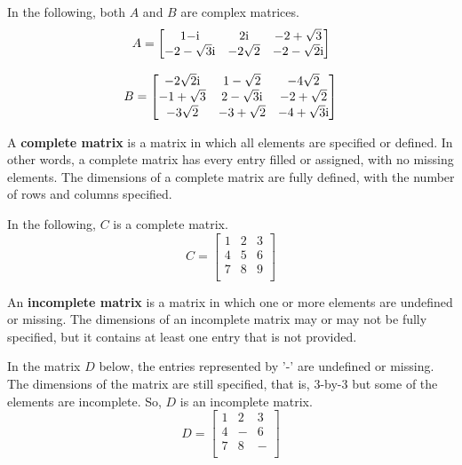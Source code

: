 \begin{definition}
\begin{example}
In the following, both $A$ and $B$ are complex matrices.
\[
A = \begin{bmatrix}
    1 - $i$  & 2$i$ & -2 + \sqrt{3} \\
    -2 - \sqrt{3}$i$ & -2\sqrt{2} & -2 - \sqrt{2}$i$
\end{bmatrix}
\]

\[
B = \begin{bmatrix}
    -2\sqrt{2}$i$ & 1 - \sqrt{2} & -4\sqrt{2} \\
    -1 + \sqrt{3} & 2 - \sqrt{3}$i$ & -2 + \sqrt{2} \\
    -3\sqrt{2} & -3 + \sqrt{2} & -4 + \sqrt{3}$i$
\end{bmatrix}
\]
\end{example}


\begin{definition} 
   A \textbf{complete matrix} is a matrix in which all elements are specified or defined. In other words, a complete matrix has every entry filled or assigned, with no missing elements. The dimensions of a complete matrix are fully defined, with the number of rows and columns specified.

\end{definition}
\begin{example}
In the following, $C$ is a complete matrix.
    \[
C = \begin{bmatrix}
   1 & 2 & 3 \\
   4 & 5 & 6 \\
   7 & 8 & 9 \\
\end{bmatrix}
\]
\end{example} 



\begin{definition}
An \textbf{incomplete matrix} is a matrix in which one or more elements are undefined or missing. The dimensions of an incomplete matrix may or may not be fully specified, but it contains at least one entry that is not provided.    
\end{definition}

\begin{example}
In the matrix $D$ below, the entries represented by '-' are undefined or missing. The dimensions of the matrix are still specified, that is, $3$-by-$3$ but some of the elements are incomplete. So, $D$ is an incomplete matrix.
\[
D = \begin{bmatrix}
   1 & 2 & 3 \\
   4 & - & 6 \\
   7 & 8 & - \\
\end{bmatrix}
\]
\end{example}




\end{definition}
